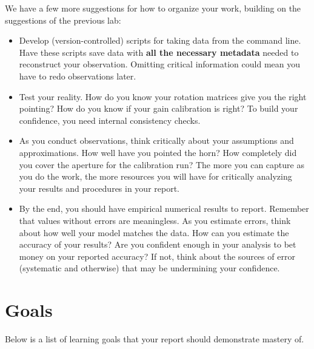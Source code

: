 \documentclass[11pt,preprint]{aastex}
\begin{document}
We have a few more suggestions for how to organize your work, building on the 
suggestions of the previous lab:
\begin{itemize}

\item Develop (version-controlled) scripts for taking data from the command line.
Have these scripts save data with {\bf all the necessary metadata} needed to 
reconstruct your observation. Omitting critical information could
mean you have to redo observations later.

\item Test your reality. How do you know your rotation matrices give you the
right pointing? How do you know if your gain calibration is right? To build
your confidence, you need internal consistency checks.

\item As you conduct observations, think critically about your assumptions and
approximations.  How well have you pointed the horn? How completely did
you cover the aperture for the calibration run? The more you can capture
as you do the work, the more resources you will have for critically analyzing your
results and procedures in your report.

\item By the end, you should have empirical numerical results to report. Remember
that values without errors are meaningless. As you estimate errors, think about how 
well your model matches the data. How can you estimate the
accuracy of your results? Are you confident enough in your analysis to
bet money on your reported accuracy? If not, think about the sources of error
(systematic and otherwise) that may be undermining your confidence.

\end{itemize}


\section{Goals} \label{sec:goals}

\noindent
Below is a list of learning goals that your report should demonstrate mastery of.
\end{document}
